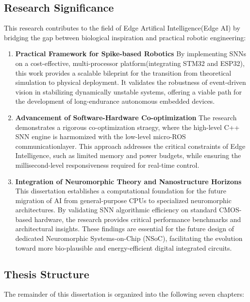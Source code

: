 \subsection{Research Significance}
This research contributes to the field of Edge Artifical Intelligence(Edge AI) by
bridging the gap between biological inspiration and practical robotic engineering:

\begin{enumerate}[label=\textbf{\arabic*.}, leftmargin=*]
    \item \textbf{Practical Framework for Spike-based Robotics} \newline
    By implementing SNNs on a cost-effective, multi-processor platform(integrating STM32
    and ESP32), this work provides a scalable bileprint for the transition from theoretical
    simulation to physical deployment. It validates the robustness of event-driven vision
    in stabilizing dynamically unstable systems, offering a viable path for the development
    of long-endurance autonomous embedded devices.
    
    \item \textbf{Advancement of Software-Hardware Co-optimization} \newline
    The research demonstrates a rigorous co-optimization straegy, where the high-level C++
    SNN engine is harmomized with the low-level micro-ROS communicationlayer. 
    This approach addresses the critical constraints of Edge Intelligence,
     such as limited memory and power budgets, 
     while ensuring the millisecond-level responsiveness required for real-time control.
    
    \item \textbf{Integration of Neuromorphic Theory and Nanostructure Horizons}\newline 
    This dissertation establishes a computational foundation for the future migration of AI 
    from general-purpose CPUs to specialized neuromorphic architectures. By validating SNN 
    algorithmic efficiency on standard CMOS-based hardware, the research provides critical 
    performance benchmarks and architectural insights. These findings are essential for the 
    future design of dedicated Neuromorphic Systems-on-Chip (NSoC), facilitating the evolution 
    toward more bio-plausible and energy-efficient digital integrated circuits.
\end{enumerate}

\subsection{Thesis Structure}
The remainder of this dissertation is organized into the following seven chapters:

